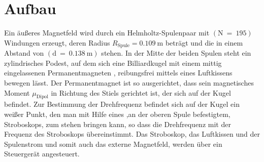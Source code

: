 \section{Aufbau}
\label{sec:Aufbau}

Ein äußeres Magnetfeld wird durch ein Helmholtz-Spulenpaar mit  $(\text{N} \: = \: 195)$ Windungen erzeugt,
deren Radius $R_{\text{Spule}} = 0.109 \: \si{\meter}$ beträgt und die in einem Abstand von $(\text{d} \: = \: 0.138 \: \si{\meter})$ stehen.
In der Mitte der beiden Spulen steht ein zylindrisches Podest, auf dem sich eine Billiardkugel mit einem mittig eingelassenen Permanentmagneten ,
reibungsfrei mittels eines Luftkissens bewegen lässt.
Der Permanentmagnet ist so ausgerichtet, dass sein magnetisches Moment $\mu_{\text{Dipol}}$ in Richtung des Stiels gerichtet ist, der sich auf der Kugel befindet.
Zur Bestimmung der Drehfrequenz befindet sich auf der Kugel ein weißer Punkt, den man mit Hilfe eines ,an der oberen Spule befestigtem, Stroboskops,
zum stehen bringen kann, so dass die Drehfrequenz mit der Frequenz des Stroboskops übereinstimmt.
Das Stroboskop, das Luftkissen und der Spulenstrom und somit auch das externe Magnetfeld, werden über ein Steuergerät angesteuert.
